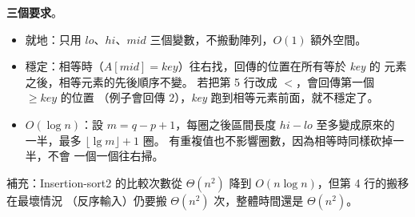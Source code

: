 \begin{pastsoln}
\textbf{三個要求}。
\begin{itemize}
\item 就地：只用 $\mathit{lo}$、$\mathit{hi}$、$\mathit{mid}$ 三個變數，不搬動陣列，$O(1)$ 額外空間。
\item 穩定：相等時（$A[\mathit{mid}] = \mathit{key}$）往右找，回傳的位置在所有等於 \textit{key} 的
元素之後，相等元素的先後順序不變。 若把第 5 行改成 $<$，會回傳第一個 $\ge \mathit{key}$ 的位置
（例子會回傳 $2$），\textit{key} 跑到相等元素前面，就不穩定了。
\item $O(\log n)$：設 $m = q - p + 1$，每圈之後區間長度 $\mathit{hi} - \mathit{lo}$ 至多變成原來的
一半，最多 $\lfloor \lg m \rfloor + 1$ 圈。 有重複值也不影響圈數，因為相等時同樣砍掉一半，不會
一個一個往右掃。
\end{itemize}

補充：Insertion-sort2 的比較次數從 $\Theta(n^2)$ 降到 $O(n \log n)$，但第 4 行的搬移在最壞情況
（反序輸入）仍要搬 $\Theta(n^2)$ 次，整體時間還是 $\Theta(n^2)$。
\end{pastsoln}

